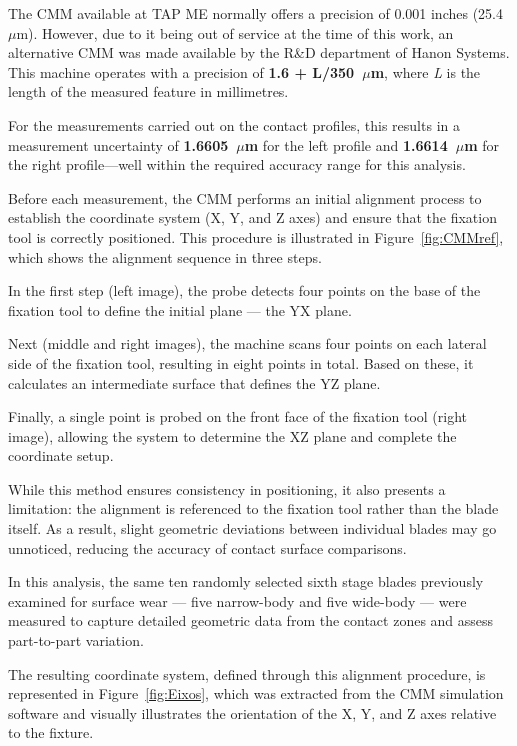 The CMM available at TAP ME normally offers a precision of 0.001 inches (25.4~$\mu$m). However, due to it being out of service at the time of this work, an alternative CMM was made available by the R\&D department of Hanon Systems. This machine operates with a precision of \textbf{1.6 + L/350~$\mu$m}, where \textit{L} is the length of the measured feature in millimetres.

For the measurements carried out on the contact profiles, this results in a measurement uncertainty of \textbf{1.6605~$\mu$m} for the left profile and \textbf{1.6614~$\mu$m} for the right profile---well within the required accuracy range for this analysis.


Before each measurement, the CMM performs an initial alignment process to establish the coordinate system (X, Y, and Z axes) and ensure that the fixation tool is correctly positioned. This procedure is illustrated in Figure~\ref{fig:CMMref}, which shows the alignment sequence in three steps.

In the first step (left image), the probe detects four points on the base of the fixation tool to define the initial plane — the YX plane.

Next (middle and right images), the machine scans four points on each lateral side of the fixation tool, resulting in eight points in total. Based on these, it calculates an intermediate surface that defines the YZ plane.

Finally, a single point is probed on the front face of the fixation tool (right image), allowing the system to determine the XZ plane and complete the coordinate setup.

While this method ensures consistency in positioning, it also presents a limitation: the alignment is referenced to the fixation tool rather than the blade itself. As a result, slight geometric deviations between individual blades may go unnoticed, reducing the accuracy of contact surface comparisons.

In this analysis, the same ten randomly selected sixth stage blades previously examined for surface wear — five narrow-body and five wide-body — were measured to capture detailed geometric data from the contact zones and assess part-to-part variation.

The resulting coordinate system, defined through this alignment procedure, is represented in Figure~\ref{fig:Eixos}, which was extracted from the CMM simulation software and visually illustrates the orientation of the X, Y, and Z axes relative to the fixture.



